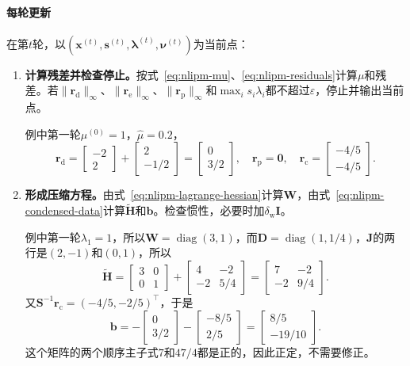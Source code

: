 \paragraph{每轮更新}
在第$t$轮，以$(\bm{x}^{(t)},\bm{s}^{(t)},\bm{\lambda}^{(t)},\bm{\nu}^{(t)})$为当前点：
\begin{enumerate}
 \item \textbf{计算残差并检查停止。}按式~\eqref{eq:nlipm-mu}、\eqref{eq:nlipm-residuals}计算$\mu$和残差。若$\lVert\bm{r}_{\mathrm{d}}\rVert_\infty$、$\lVert\bm{r}_{\mathrm{e}}\rVert_\infty$、$\lVert\bm{r}_{\mathrm{p}}\rVert_\infty$和$\max_is_i\lambda_i$都不超过$\varepsilon$，停止并输出当前点。

 例中第一轮$\mu^{(0)}=1$，$\hat{\mu}=0.2$，
 \[
  \bm{r}_{\mathrm{d}}=\begin{bmatrix}-2\\2\end{bmatrix}+\begin{bmatrix}2\\-1/2\end{bmatrix}=\begin{bmatrix}0\\3/2\end{bmatrix},\quad
  \bm{r}_{\mathrm{p}}=\bm{0},\quad
  \bm{r}_{\mathrm{c}}=\begin{bmatrix}-4/5\\-4/5\end{bmatrix}.
 \]

 \item \textbf{形成压缩方程。}由式~\eqref{eq:nlipm-lagrange-hessian}计算$\bm{W}$，由式~\eqref{eq:nlipm-condensed-data}计算$\tilde{\bm{H}}$和$\bm{b}$。检查惯性，必要时加$\delta_{\mathrm{w}}\bm{I}$。

 例中第一轮$\lambda_1=1$，所以$\bm{W}=\operatorname{diag}(3,1)$，而$\bm{D}=\operatorname{diag}(1,1/4)$，$\bm{J}$的两行是$(2,-1)$和$(0,1)$，所以
 \[
  \tilde{\bm{H}}=\begin{bmatrix}3&0\\0&1\end{bmatrix}+\begin{bmatrix}4&-2\\-2&5/4\end{bmatrix}=\begin{bmatrix}7&-2\\-2&9/4\end{bmatrix}.
 \]
 又$\bm{S}^{-1}\bm{r}_{\mathrm{c}}=(-4/5,-2/5)^\top$，于是
 \[
  \bm{b}=-\begin{bmatrix}0\\3/2\end{bmatrix}-\begin{bmatrix}-8/5\\2/5\end{bmatrix}=\begin{bmatrix}8/5\\-19/10\end{bmatrix}.
 \]
 这个矩阵的两个顺序主子式$7$和$47/4$都是正的，因此正定，不需要修正。


\end{enumerate}
